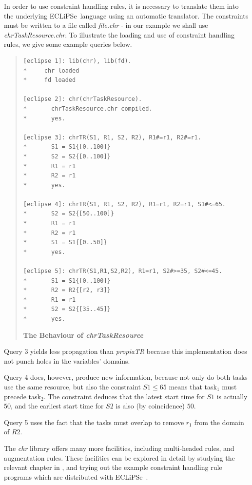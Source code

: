 \documentclass[a4wide]{article}
\newcommand{\ECL}{\mbox{ECLiPSe\ }{\hspace{1mm}}}
\begin{document}
In order to use constraint handling rules, it is necessary to
translate them into the underlying \ECL language using an automatic
translator.
The constraints must be written to a file called {\em file.chr} - in
our example we shall use {\em chrTaskResource.chr}.
To illustrate the loading and use of constraint handling rules,  we
give some example queries below.
\begin{quote}
\begin{verbatim}
[eclipse 1]: lib(chr), lib(fd).
*     chr loaded
*     fd loaded

[eclipse 2]: chr(chrTaskResource).
*       chrTaskResource.chr compiled.
*       yes.

[eclipse 3]: chrTR(S1, R1, S2, R2), R1#=r1, R2#=r1.
*       S1 = S1{[0..100]}
*       S2 = S2{[0..100]}
*       R1 = r1
*       R2 = r1
*       yes.

[eclipse 4]: chrTR(S1, R1, S2, R2), R1=r1, R2=r1, S1#<=65.
*       S2 = S2{[50..100]}
*       R1 = r1
*       R2 = r1
*       S1 = S1{[0..50]}
*       yes.

[eclipse 5]: chrTR(S1,R1,S2,R2), R1=r1, S2#>=35, S2#<=45.
*       S1 = S1{[0..100]}
*       R2 = R2{[r2, r3]}
*       R1 = r1
*       S2 = S2{[35..45]}
*       yes.

\end{verbatim}
{\bf The Behaviour of {\em chrTaskResource}}
\label{chrnolapbehaviour}
\end{quote} 

Query 3 yields less propagation than {\em propiaTR} because this
implementation does not punch holes in the variables' domains.

Query 4 does, however, produce new information, because not only do
both tasks use the same resource, but also the constraint $S1 \leq 65$
means that task$_1$ must precede task$_2$. 
The constraint deduces that the latest start time for $S1$ is actually
$50$, and the earliest start time for $S2$ is also (by coincidence)
$50$.

Query 5 uses the fact that the tasks must overlap to remove $r_1$ from
the domain of $R2$.

The {\em chr} library offers many more facilities, including
multi-headed rules, and augmentation rules.
These facilities can be explored in detail by studying the relevant
chapter in \cite{eclipseext}, and trying out the example constraint
handling rule programs which are distributed with \ECL.
\end{document}
